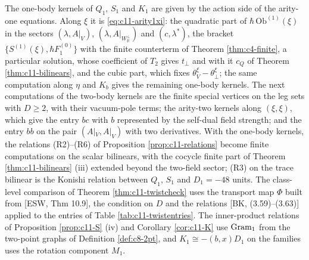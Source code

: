 \begin{remark}
\label{rem:c11-next}
The one-body kernels of $Q_1$, $S_1$ and $K_1$ are given by the action side of the arity-one equations. Along $\xi$ it is \eqref{eq:c11-arity1xi}: the quadratic part of $\hbar\,\mathrm{Ob}^{(1)}(\xi)$ in the sectors $(\lambda,A|_V)$, $(\lambda,A|_{W_{\mathbb R}^\perp})$ and $(c,\lambda^*)$, the bracket $\{S^{(1)}(\xi),\hbar F_1^{(0)}\}$ with the finite counterterm of Theorem \ref{thm:c4-finite}, a particular solution, whose coefficient of $T_2$ gives $t_\perp$ and with it $c_Q$ of Theorem \ref{thm:c11-bilinears}, and the cubic part, which fixes $\theta^\xi_V-\theta^\xi_\perp$; the same computation along $\eta$ and $K_b$ gives the remaining one-body kernels. The next computations of the two-body kernels are the finite special vertices on the leg sets with $D\ge2$, with their vacuum-pole terms; the arity-two kernels along $(\xi,\xi)$, which give the entry $bc$ with $b$ represented by the self-dual field strength; and the entry $bb$ on the pair $(A|_V,A|_V)$ with two derivatives. With the one-body kernels, the relations (R2)--(R6) of Proposition \ref{prop:c11-relations} become finite computations on the scalar bilinears, with the cocycle finite part of Theorem \ref{thm:c11-bilinears} (iii) extended beyond the two-field sector; (R3) on the trace bilinear is the Konishi relation between $Q_1$, $S_1$ and $D_1=-48$ units. The class-level comparison of Theorem \ref{thm:c11-twistcheck} uses the transport map $\Phi$ built from [ESW, Thm 10.9], the condition on $D$ and the relations [BK, (3.59)--(3.63)] applied to the entries of Table \ref{tab:c11-twistentries}. The inner-product relations of Proposition \ref{prop:c11-S} (iv) and Corollary \ref{cor:c11-K} use $\mathrm{Gram}_{\rm 1}$ from the two-point graphs of Definition \ref{def:c8-2pt}, and $K_1\cong-(b,x)D_1$ on the families uses the rotation component $M_1$.
\end{remark}

